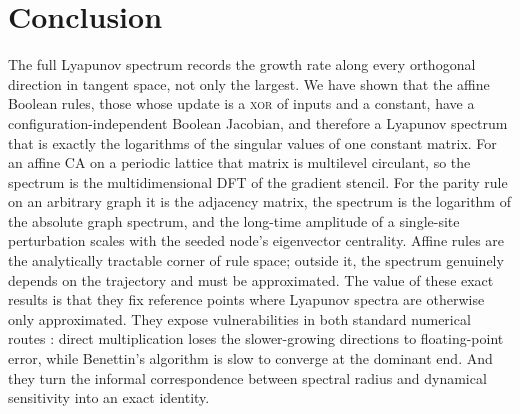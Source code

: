 \documentclass[a4paper,fleqn]{cas-dc}
\begin{document}
\section{Conclusion}
\label{sec:conclusion}

The full Lyapunov spectrum records the growth rate along every orthogonal direction in tangent space, not only the largest. We have shown that the affine Boolean rules, those whose update is a \textsc{xor} of inputs and a constant, have a configuration-independent Boolean Jacobian, and therefore a Lyapunov spectrum that is exactly the logarithms of the singular values of one constant matrix. For an affine CA on a periodic lattice that matrix is multilevel circulant, so the spectrum is the multidimensional DFT of the gradient stencil. For the parity rule on an arbitrary graph it is the adjacency matrix, the spectrum is the logarithm of the absolute graph spectrum, and the long-time amplitude of a single-site perturbation scales with the seeded node's eigenvector centrality. Affine rules are the analytically tractable corner of rule space; outside it, the spectrum genuinely depends on the trajectory and must be approximated. The value of these exact results is that they fix reference points where Lyapunov spectra are otherwise only approximated. They expose vulnerabilities in both standard numerical routes \cite{vispoel2024damage}: direct multiplication loses the slower-growing directions to floating-point error, while Benettin's algorithm is slow to converge at the dominant end. And they turn the informal correspondence between spectral radius and dynamical sensitivity into an exact identity.
\end{document}
